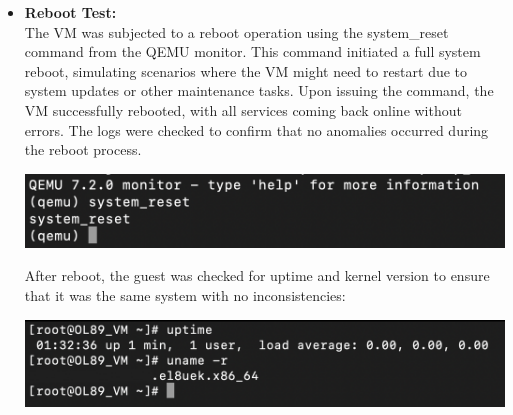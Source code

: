 \begin{itemize}
    \item \textbf{Reboot Test: }\\
          The VM was subjected to a reboot operation using the system\_reset command from the QEMU monitor. This command initiated a full system reboot, simulating scenarios where the VM might need to restart due to system updates or other maintenance tasks. Upon issuing the command, the VM successfully rebooted, with all services coming back online without errors. The logs were checked to confirm that no anomalies occurred during the reboot process.
          \begin{center}
              \includegraphics[width=\linewidth]{Images/Rebooting the Guest.png}
              \label{fig:reboot}
          \end{center}

          After reboot, the guest was checked for uptime and kernel version to ensure that it was the same system with no inconsistencies:
          \begin{center}
              \includegraphics[width=\linewidth]{Images/After Rebooting on the Guest.png}
              \label{fig:areboot}
          \end{center}


\end{itemize}
